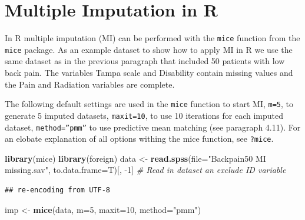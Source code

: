 \documentclass[
]{book}
\newenvironment{Shaded}{\begin{snugshade}}{\end{snugshade}}
\newcommand{\CommentTok}[1]{\textcolor[rgb]{0.56,0.35,0.01}{\textit{#1}}}
\newcommand{\DataTypeTok}[1]{\textcolor[rgb]{0.13,0.29,0.53}{#1}}
\newcommand{\DecValTok}[1]{\textcolor[rgb]{0.00,0.00,0.81}{#1}}
\newcommand{\KeywordTok}[1]{\textcolor[rgb]{0.13,0.29,0.53}{\textbf{#1}}}
\newcommand{\NormalTok}[1]{#1}
\newcommand{\StringTok}[1]{\textcolor[rgb]{0.31,0.60,0.02}{#1}}
\begin{document}
\hypertarget{multiple-imputation-in-r}{%
\section{Multiple Imputation in R}\label{multiple-imputation-in-r}}

In R multiple imputation (MI) can be performed with the \texttt{mice} function from the \texttt{mice} package. As an example dataset to show how to apply MI in R we use the same dataset as in the previous paragraph that included 50 patients with low back pain. The variables Tampa scale and Disability contain missing values and the Pain and Radiation variables are complete.

The following default settings are used in the \texttt{mice} function to start MI, \texttt{m=5}, to generate 5 imputed datasets, \texttt{maxit=10}, to use 10 iterations for each imputed dataset, \texttt{method=”pmm”} to use predictive mean matching (see paragraph 4.11). For an elobate explanation of all options withing the mice function, see \texttt{?mice}.

\begin{Shaded}
\begin{Highlighting}[]
\KeywordTok{library}\NormalTok{(mice)}
\KeywordTok{library}\NormalTok{(foreign)}
\NormalTok{data <-}\StringTok{ }\KeywordTok{read.spss}\NormalTok{(}\DataTypeTok{file=}\StringTok{"Backpain50 MI missing.sav"}\NormalTok{, }\DataTypeTok{to.data.frame=}\NormalTok{T)[, }\DecValTok{-1}\NormalTok{] }\CommentTok{# Read in dataset an exclude ID variable}
\end{Highlighting}
\end{Shaded}

\begin{verbatim}
## re-encoding from UTF-8
\end{verbatim}

\begin{Shaded}
\begin{Highlighting}[]
\NormalTok{imp <-}\StringTok{ }\KeywordTok{mice}\NormalTok{(data, }\DataTypeTok{m=}\DecValTok{5}\NormalTok{, }\DataTypeTok{maxit=}\DecValTok{10}\NormalTok{, }\DataTypeTok{method=}\StringTok{"pmm"}\NormalTok{)}
\end{Highlighting}
\end{Shaded}
\end{document}
